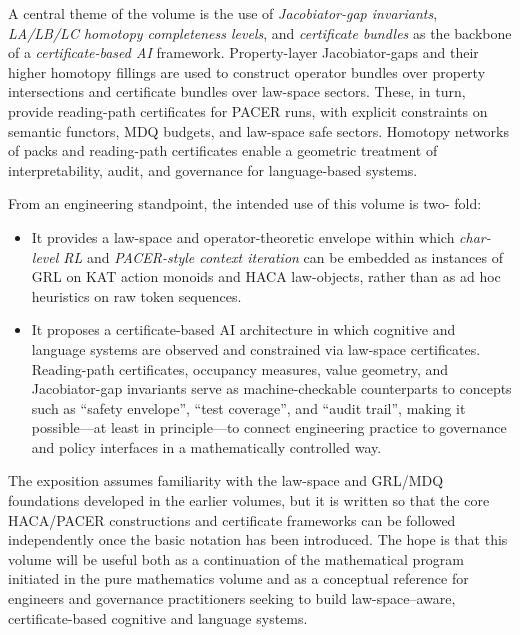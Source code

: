 \documentclass[11pt]{book}
\theoremstyle{plain}
\theoremstyle{definition}
\theoremstyle{remark}
\begin{document}
A central theme of the volume is the use of \emph{Jacobiator-gap
invariants}, \emph{LA/LB/LC homotopy completeness levels}, and
\emph{certificate bundles} as the backbone of a \emph{certificate-based
AI} framework. Property-layer Jacobiator-gaps and their higher homotopy
fillings are used to construct operator bundles over property
intersections and certificate bundles over law-space sectors. These, in
turn, provide reading-path certificates for PACER runs, with explicit
constraints on semantic functors, MDQ budgets, and law-space safe
sectors. Homotopy networks of packs and reading-path certificates enable
a geometric treatment of interpretability, audit, and governance for
language-based systems.

From an engineering standpoint, the intended use of this volume is two-
fold:
\begin{itemize}
  \item It provides a law-space and operator-theoretic envelope within
        which \emph{char-level RL} and \emph{PACER-style context
        iteration} can be embedded as instances of GRL on KAT action
        monoids and HACA law-objects, rather than as ad hoc heuristics
        on raw token sequences.
  \item It proposes a certificate-based AI architecture in which
        cognitive and language systems are observed and constrained via
        law-space certificates. Reading-path certificates, occupancy
        measures, value geometry, and Jacobiator-gap invariants serve as
        machine-checkable counterparts to concepts such as ``safety
        envelope'', ``test coverage'', and ``audit trail'', making it
        possible—at least in principle—to connect engineering practice
        to governance and policy interfaces in a mathematically
        controlled way.
\end{itemize}

The exposition assumes familiarity with the law-space and GRL/MDQ
foundations developed in the earlier volumes, but it is written so that
the core HACA/PACER constructions and certificate frameworks can be
followed independently once the basic notation has been introduced. The
hope is that this volume will be useful both as a continuation of the
mathematical program initiated in the pure mathematics volume and as a
conceptual reference for engineers and governance practitioners seeking
to build law-space–aware, certificate-based cognitive and language
systems.


\tableofcontents
\end{document}
